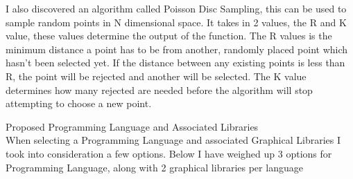 \begin{flushleft}
\begin{enumerate}
\begin{enumerate}
                    I also discovered an algorithm called Poisson Disc Sampling, this can be used to sample random points 
                    in N dimensional space. It takes in 2 values, the R and K value, these values determine the output of
                    the function. The R values is the minimum distance a point has to be from another, randomly placed point
                    which hasn't been selected yet. If the distance between any existing points is less than R, the point
                    will be rejected and another will be selected. The K value determines how many rejected are needed before 
                    the algorithm will stop attempting to choose a new point.
                    
                    \vspace{0.5cm}
                    {\Large Proposed Programming Language and Associated Libraries} \\
                    When selecting a Programming Language and associated Graphical Libraries I took into consideration a few options.
                    Below I have weighed up 3 options for Programming Language, along with 2 graphical libraries per language
                    

\end{enumerate}
\end{enumerate}
\end{flushleft}
